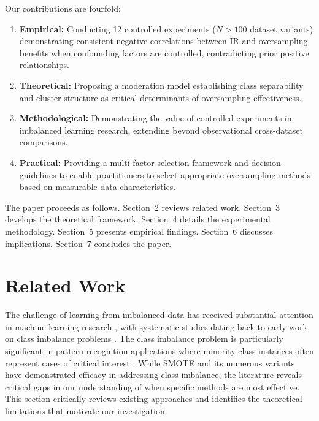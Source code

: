 \documentclass{ijSmartGrid}
\theoremstyle{definition}
\begin{document}
\indent Our contributions are fourfold:
\begin{enumerate}
    \item \textbf{Empirical:} Conducting 12 controlled experiments ($N>100$ dataset variants) demonstrating consistent negative correlations between IR and oversampling benefits when confounding factors are controlled, contradicting prior positive relationships.
    
    \item \textbf{Theoretical:} Proposing a moderation model establishing class separability and cluster structure as critical determinants of oversampling effectiveness.
    
    \item \textbf{Methodological:} Demonstrating the value of controlled experiments in imbalanced learning research, extending beyond observational cross-dataset comparisons.
    
    \item \textbf{Practical:} Providing a multi-factor selection framework and decision guidelines to enable practitioners to select appropriate oversampling methods based on measurable data characteristics.
\end{enumerate}

\indent The paper proceeds as follows. Section~2 reviews related work. Section~3 develops the theoretical framework. Section~4 details the experimental methodology. Section~5 presents empirical findings. Section~6 discusses implications. Section~7 concludes the paper.

\section{Related Work}
\indent The challenge of learning from imbalanced data has received substantial attention in machine learning research \cite{he2009learning,guo2017learning,fernandez2018smote}, with systematic studies dating back to early work on class imbalance problems \cite{japkowicz2002class,chawla2004special}. The class imbalance problem is particularly significant in pattern recognition applications where minority class instances often represent cases of critical interest \cite{pr2017cnn,pr2019radial}. While SMOTE and its numerous variants have demonstrated efficacy in addressing class imbalance, the literature reveals critical gaps in our understanding of when specific methods are most effective. This section critically reviews existing approaches and identifies the theoretical limitations that motivate our investigation.
\end{document}
